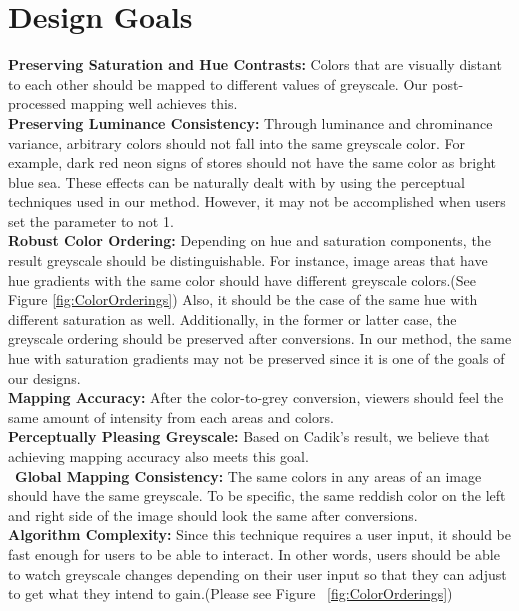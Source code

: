 \documentclass{article}
\begin{document}
\section{Design Goals}
\textbf{Preserving Saturation and Hue Contrasts:} Colors that are visually distant to each other should be mapped to different values of greyscale. Our post-processed mapping well achieves this.\\
\textbf{Preserving Luminance Consistency:} Through luminance and chrominance variance, arbitrary colors should not fall into the same greyscale color. For example, dark red neon signs of stores should not have the same color as bright blue sea. These effects can be naturally dealt with by using the perceptual techniques used in our method. However, it may not be accomplished when users set the parameter to not 1.\\
\textbf{Robust Color Ordering:} Depending on hue and saturation components, the result greyscale should be distinguishable. For instance, image areas that have hue gradients with the same color should have different greyscale colors.(See Figure \ref{fig:ColorOrderings}) Also, it should be the case of the same hue with different saturation as well. Additionally, in the former or latter case, the greyscale ordering should be preserved after conversions. In our method, the same hue with saturation gradients may not be preserved since it is one of the goals of our designs.\\
\textbf{Mapping Accuracy:} After the color-to-grey conversion, viewers should feel the same amount of intensity from each areas and colors.\\
\textbf{Perceptually Pleasing Greyscale:} Based on Cadik's result, we believe that achieving mapping accuracy also meets this goal.\\\
\textbf{Global Mapping Consistency:} The same colors in any areas of an image should have the same greyscale. To be specific, the same reddish color on the left and right side of the image should look the same after conversions.\\
\textbf{Algorithm Complexity:} Since this technique requires a user input, it should be fast enough for users to be able to interact. In other words, users should be able to watch greyscale changes depending on their user input so that they can adjust to get what they intend to gain.(Please see Figure ~\ref{fig:ColorOrderings})\\
\end{document}
